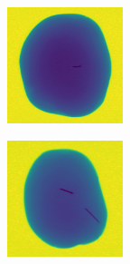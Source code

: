 \documentclass[11pt]{article}
\begin{document}
\begin{figure}[!h]
\begin{subfigure}[b]{0.22\textwidth}
         \caption{}
         \label{fig:metal_37}
     \end{subfigure}
     \hfill
     \begin{subfigure}[b]{0.22\textwidth}
         \centering
         \includegraphics[width=\textwidth]{figurer/potato_dataset/metal/metal_38.jpg}
         \caption{}
         \label{fig:metal_38}
     \end{subfigure}
     \hfill
     \begin{subfigure}[b]{0.22\textwidth}
         \centering
         \includegraphics[width=\textwidth]{figurer/potato_dataset/metal/metal_39.jpg}

\end{subfigure}
\end{figure}
\end{document}
